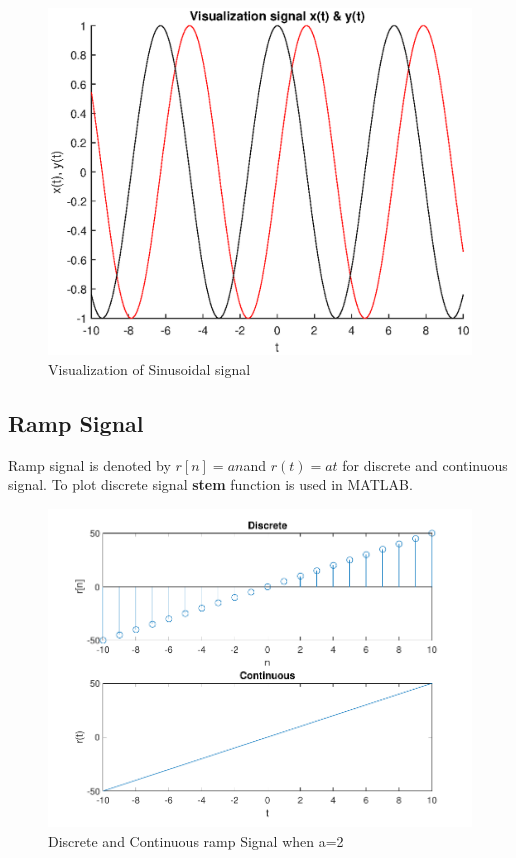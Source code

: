 \documentclass{article}
\begin{document}
\begin{figure}[H]
    \centering
    \includegraphics[scale=1.2,cframe=blue 0.5pt 3pt]{./FIG/sinu}
    \caption{Visualization of Sinusoidal signal }
\end{figure}



\subsection{Ramp Signal}
Ramp signal is denoted by $r[n]=an $and $r(t)=at$ for discrete and continuous signal. To plot discrete signal \textbf{stem} function is used in MATLAB.

\begin{figure}[H]
    \centering
    \includegraphics[scale=1.4,cframe=blue 0.5pt 3pt]{./FIG/ramp}
    \caption{Discrete and Continuous ramp Signal when a=2}
\end{figure}
\end{document}
